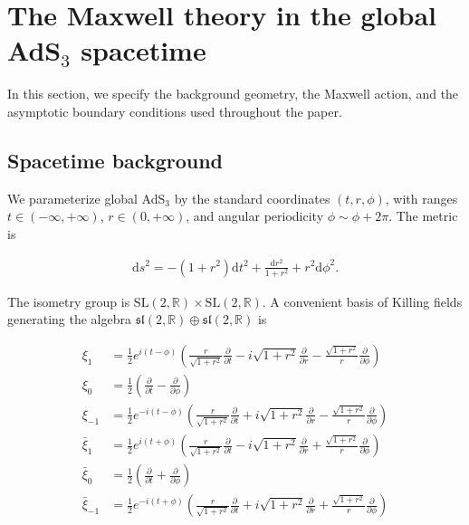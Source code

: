 \section{\texorpdfstring{The Maxwell theory in the global AdS$_3$ spacetime}{The Maxwell theory in the global AdS3 spacetime}}\label{sec:maxwell-fields-global-ads3}

In this section, we specify the background geometry, the Maxwell action, and the asymptotic boundary conditions used throughout the paper.

\subsection{Spacetime background}\label{subsec:spacetime-background}

We parameterize global AdS$_3$ by the standard coordinates $(t, r, \phi)$, with ranges $t \in (-\infty, +\infty)$, $r \in (0, +\infty)$, and angular periodicity $\phi \sim \phi + 2\pi$. The metric is

\begin{align}
\mathrm{d}s^2 = -(1+r^2)\mathrm{d}t^2 + \frac{\mathrm{d}r^2}{1+r^2} + r^2 \mathrm{d}\phi^2.
\end{align}

The isometry group is $\mathrm{SL}(2, \mathbb{R}) \times \mathrm{SL}(2, \mathbb{R})$. A convenient basis of Killing fields generating the algebra $\mathfrak{sl}(2, \mathbb{R}) \oplus \mathfrak{sl}(2, \mathbb{R})$ is

\begin{align}
\xi _{1} & =\frac{1}{2}e^{i(t-\phi)}\left(\frac{r}{\sqrt{ 1+r^{2} }} \frac{\partial}{\partial t}-i\sqrt{ 1+r^{2} } \frac{\partial}{\partial r}-\frac{\sqrt{ 1+r^{2} }}{r} \frac{\partial}{\partial \phi}\right) \\
\xi _{0} & =\frac{1}{2}\left(\frac{\partial}{\partial t}-\frac{\partial}{\partial \phi}\right) \\
\xi _{-1} & =\frac{1}{2}e^{-i(t-\phi)}\left(\frac{r}{\sqrt{ 1+r^{2} }} \frac{\partial}{\partial t}+i\sqrt{ 1+r^{2} } \frac{\partial}{\partial r}-\frac{\sqrt{ 1+r^{2} }}{r} \frac{\partial}{\partial \phi}\right) \\
\bar{\xi}_{1} & =\frac{1}{2}e^{i(t+\phi)}\left(\frac{r}{\sqrt{ 1+r^{2} }} \frac{\partial}{\partial t}-i\sqrt{ 1+r^{2} } \frac{\partial}{\partial r}+\frac{\sqrt{ 1+r^{2} }}{r} \frac{\partial}{\partial \phi}\right) \\
\bar{\xi}_{0} & =\frac{1}{2}\left(\frac{\partial}{\partial t}+\frac{\partial}{\partial \phi}\right) \\
\bar{\xi}_{-1} & =\frac{1}{2}e^{-i(t+\phi)}\left(\frac{r}{\sqrt{ 1+r^{2} }} \frac{\partial}{\partial t}+i\sqrt{ 1+r^{2} } \frac{\partial}{\partial r}+\frac{\sqrt{ 1+r^{2} }}{r} \frac{\partial}{\partial \phi}\right)
\end{align}


